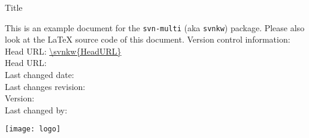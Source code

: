 \documentclass[12pt]{report}
\begin{document}
\begin{titlepage}
 \vspace{8ex}
 {\huge Title\par}
 \vspace{2ex}
 {\large \noindent This is an example document for the \texttt{svn-multi} (aka
 \texttt{svnkw}) package. Please also look at the LaTeX source code of this
 document.}
 \vfill
 \flushleft\sffamily
 Version control information:\\
 Head URL: \url{\svnkw{HeadURL}}\\
 Head URL: \\
 Last changed date: \svndate\\
 Last changes revision: \svnrev\\
 Version: \svnFullRevision*{\svnrev}\\
 Last changed by: \svnFullAuthor*{\svnauthor}\\
\end{titlepage}

\tableofcontents


%
%


%
\makeatletter

\makeatother
\texttt{[image: logo]}
\end{document}

